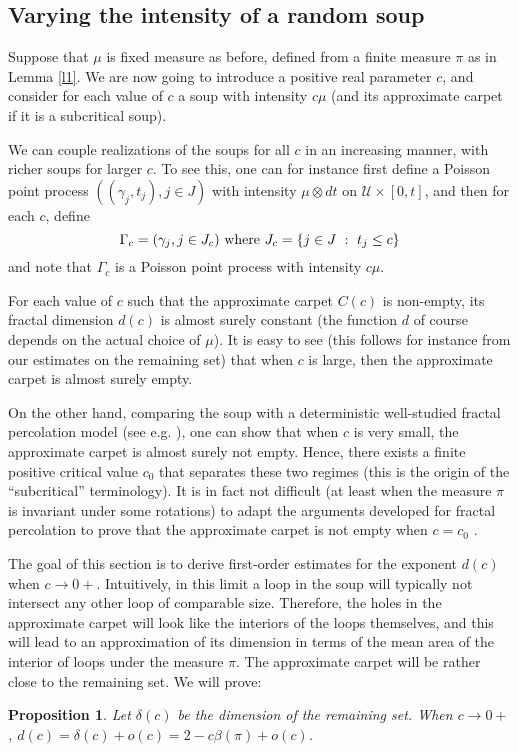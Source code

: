 \documentclass[11pt]{article}
\newtheorem {proposition}[Theorem]    {Proposition}
\begin{document}
\subsection {Varying the intensity of a random soup} \label{sec_intensity}

Suppose that $\mu$ is fixed measure as before, defined from a finite measure $\pi$ as in Lemma \ref {l1}. We are now going to introduce a positive real parameter $c$, and consider for each value of $c$ a soup with intensity $c\mu$ (and its approximate carpet if it is a subcritical soup). 

We can couple realizations of the soups for all $c$ in an increasing manner,
with richer soups for larger $c$.
To see this, one can for instance first define a Poisson point process 
$((\gamma_j, t_j), j \in J)$ with intensity 
$\mu \otimes dt$ on ${\mathcal U} \times [0,t ]$, and then for each $c$, define  
$$ \Gamma_c = ( \gamma_j, j \in J_c ) \hbox { where } J_c = \{ j \in J \ : \ t_j \le c \}$$
and note that $\Gamma_c$ is a Poisson point process with intensity $c \mu$. 
 
For each value of $c$ such that the approximate carpet $C(c)$ is non-empty, its fractal dimension $d(c)$ is almost surely constant (the function $d$ of course depends on the actual choice of $\mu$). It is easy to see 
(this follows for instance from our estimates on the remaining set)
that when $c$ is large, then the approximate carpet is almost surely empty. 


On the other hand, comparing the soup with a deterministic well-studied fractal percolation model (see e.g. \cite {Wcras, Wln}), one can show that when $c$ is very small, the approximate carpet is almost surely not empty. Hence, there exists a finite positive critical value $c_0$ that separates these two regimes (this is the origin of the ``subcritical'' terminology). It is in fact not difficult (at least when the measure $\pi$ is invariant under some rotations) to adapt the arguments developed for fractal percolation to prove that the approximate carpet is not empty when $c= c_0$ \cite {Wln}. 

The goal of this section is to  derive first-order estimates for the exponent $d(c)$ when $c \to 0+$.
 Intuitively, in this limit a loop in the soup will typically not intersect any other loop of comparable size. Therefore, the holes in the approximate carpet will look like the interiors of the loops themselves, and this will lead to an approximation of 
its dimension
in terms of the mean area of the interior of loops under the measure $\pi$. The approximate carpet will be rather close to the remaining set.
We will prove:
\begin {proposition}
\label {eq}
Let $\delta (c)$ be the dimension of the remaining set. 
When $c \to 0+$, $d(c) = \delta (c) + o (c) = 2 - c \beta(\pi) + o(c)$.
\end {proposition}
\end{document}
